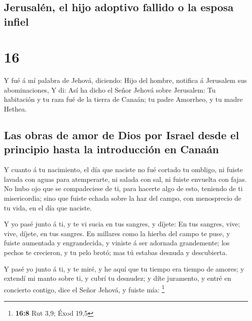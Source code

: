 \hypertarget{jerusaluxe9n-el-hijo-adoptivo-fallido-o-la-esposa-infiel}{%
\subsection{Jerusalén, el hijo adoptivo fallido o la esposa
infiel}\label{jerusaluxe9n-el-hijo-adoptivo-fallido-o-la-esposa-infiel}}

\hypertarget{section-15}{%
\section{16}\label{section-15}}

 Y fué á mí palabra de Jehová, diciendo: 
Hijo del hombre, notifica á Jerusalem sus abominaciones, 
Y di: Así ha dicho el Señor Jehová sobre Jerusalem: Tu habitación y tu
raza fué de la tierra de Canaán; tu padre Amorrheo, y tu madre Hethea.

\hypertarget{las-obras-de-amor-de-dios-por-israel-desde-el-principio-hasta-la-introducciuxf3n-en-canauxe1n}{%
\subsection{Las obras de amor de Dios por Israel desde el principio
hasta la introducción en
Canaán}\label{las-obras-de-amor-de-dios-por-israel-desde-el-principio-hasta-la-introducciuxf3n-en-canauxe1n}}

 Y cuanto á tu nacimiento, el día que naciste no fué
cortado tu ombligo, ni fuiste lavada con aguas para atemperarte, ni
salada con sal, ni fuiste envuelta con fajas.  No hubo ojo
que se compadeciese de ti, para hacerte algo de esto, teniendo de ti
misericordia; sino que fuiste echada sobre la haz del campo, con
menosprecio de tu vida, en el día que naciste.

 Y yo pasé junto á ti, y te vi sucia en tus sangres, y
díjete: En tus sangres, vive; vive, díjete, en tus sangres.
 En millares como la hierba del campo te puse, y fuiste
aumentada y engrandecida, y viniste á ser adornada grandemente; los
pechos te crecieron, y tu pelo brotó; mas tú estabas desnuda y
descubierta.

 Y pasé yo junto á ti, y te miré, y he aquí que tu tiempo
era tiempo de amores; y extendí mi manto sobre ti, y cubrí tu desnudez;
y díte juramento, y entré en concierto contigo, dice el Señor Jehová, y
fuiste mía: \footnote{\textbf{16:8} Rut 3,9; Éxod 19,5}

